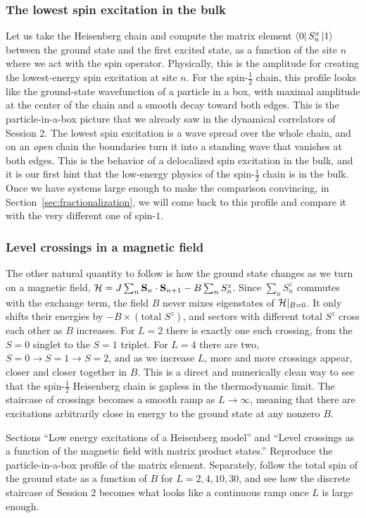 \documentclass[lecture_notes.tex]{subfiles}
\begin{document}
\subsubsection{The lowest spin excitation in the bulk}
Let us take the Heisenberg chain and compute the matrix element $\bra{0}S_n^x\ket{1}$ between the
ground state and the first excited state, as a function of the site $n$ where we act with the spin
operator. Physically, this is the amplitude for creating the lowest-energy spin excitation at site
$n$. For the spin-$\tfrac12$ chain, this profile looks like the ground-state wavefunction of a
particle in a box, with maximal amplitude at the center of the chain and a smooth decay toward
both edges. This is the particle-in-a-box picture that we already saw in the dynamical correlators
of Session 2. The lowest spin excitation is a wave spread over the whole chain, and on an
\emph{open} chain the boundaries turn it into a standing wave that vanishes at both edges. This is
the behavior of a delocalized spin excitation in the bulk, and it is our first hint that the
low-energy physics of the spin-$\tfrac12$ chain is in the bulk. Once we have systems large enough
to make the comparison convincing, in Section~\ref{sec:fractionalization}, we will come back to
this profile and compare it with the very different one of spin-$1$.

\subsubsection{Level crossings in a magnetic field}
The other natural quantity to follow is how the ground state changes as we turn on a magnetic
field, $\mathcal{H} = J\sum_n \vb S_n\cdot\vb S_{n+1} - B\sum_n S_n^z$. Since $\sum_n S_n^z$ commutes with
the exchange term, the field $B$ never mixes eigenstates of $\mathcal{H}|_{B=0}$. It only shifts their
energies by $-B\times(\text{total }S^z)$, and sectors with different total $S^z$ cross each other
as $B$ increases. For $L=2$ there is exactly one such crossing, from the $S=0$ singlet to the
$S=1$ triplet. For $L=4$ there are two, $S=0\to S=1\to S=2$, and as we increase $L$, more and more
crossings appear, closer and closer together in $B$. This is a direct and numerically clean way to
see that the spin-$\tfrac12$ Heisenberg chain is gapless in the thermodynamic limit. The staircase
of crossings becomes a smooth ramp as $L\to\infty$, meaning that there are excitations arbitrarily
close in energy to the ground state at any nonzero $B$.

\begin{notebook}
Sections ``Low energy excitations of a Heisenberg model'' and ``Level crossings as a function of
the magnetic field with matrix product states.'' Reproduce the particle-in-a-box profile of the
matrix element. Separately, follow the total spin of the ground state as a function of $B$ for
$L=2,4,10,30$, and see how the discrete staircase of Session 2 becomes what looks like a
continuous ramp once $L$ is large enough.
\end{notebook}
\end{document}
